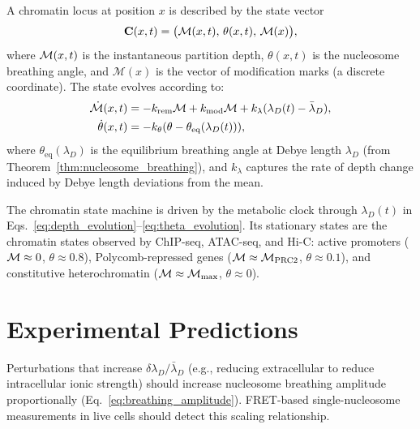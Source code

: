 \begin{definition}
\label{def:chromatin_state_machine}
A chromatin locus at position $x$ is described by the state vector
\begin{equation}
  \mathbf{C}(x,t) = \bigl(\mathcal{M}(x,t),\,\theta(x,t),\,\mathcal{M}(x)\bigr),
  \label{eq:chromatin_state}
\end{equation}
where $\mathcal{M}(x,t)$ is the instantaneous partition depth, $\theta(x,t)$ is the
nucleosome breathing angle, and $\mathcal{M}(x)$ is the vector of modification
marks (a discrete coordinate). The state evolves according to:
\begin{align}
  \dot{\mathcal{M}}(x,t) &= -k_{\mathrm{rem}}\mathcal{M} + k_{\mathrm{mod}}\mathcal{M}
    + k_\lambda(\lambda_D(t) - \bar\lambda_D), \label{eq:depth_evolution}\\
  \dot\theta(x,t) &= -k_\theta(\theta - \theta_{\mathrm{eq}}(\lambda_D(t))),
    \label{eq:theta_evolution}
\end{align}
where $\theta_{\mathrm{eq}}(\lambda_D)$ is the equilibrium breathing angle at
Debye length $\lambda_D$ (from Theorem~\ref{thm:nucleosome_breathing}), and
$k_\lambda$ captures the rate of depth change induced by Debye length
deviations from the mean.
\end{definition}

The chromatin state machine is driven by the metabolic clock through
$\lambda_D(t)$ in Eqs.~\eqref{eq:depth_evolution}--\eqref{eq:theta_evolution}.
Its stationary states are the chromatin states observed by ChIP-seq,
ATAC-seq, and Hi-C: active promoters ($\mathcal{M} \approx 0$, $\theta \approx 0.8$),
Polycomb-repressed genes ($\mathcal{M} \approx \mathcal{M}_{\mathrm{PRC2}}$,
$\theta \approx 0.1$), and constitutive heterochromatin
($\mathcal{M} \approx \mathcal{M}_{\max}$, $\theta \approx 0$).

\section{Experimental Predictions}
\label{sec:ch19_predictions}

\begin{proposition}
\label{prop:breathing_scaling}
Perturbations that increase $\delta\lambda_D/\bar\lambda_D$ (e.g., reducing
extracellular  to reduce intracellular ionic strength) should increase
nucleosome breathing amplitude proportionally (Eq.~\eqref{eq:breathing_amplitude}).
FRET-based single-nucleosome measurements in live cells should detect this
scaling relationship.
\end{proposition}

